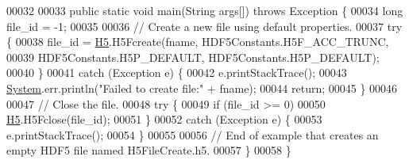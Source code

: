 \begin{DoxyCode}
00032 
00033     \textcolor{keyword}{public} \textcolor{keyword}{static} \textcolor{keywordtype}{void} main(String args[]) \textcolor{keywordflow}{throws} Exception \{
00034         \textcolor{keywordtype}{long} file\_id = -1;
00035 
00036         \textcolor{comment}{// Create a new file using default properties.}
00037         \textcolor{keywordflow}{try} \{
00038             file\_id = \hyperlink{namespace_h5}{H5}.H5Fcreate(fname, HDF5Constants.H5F\_ACC\_TRUNC,
00039                     HDF5Constants.H5P\_DEFAULT, HDF5Constants.H5P\_DEFAULT);
00040         \}
00041         \textcolor{keywordflow}{catch} (Exception e) \{
00042             e.printStackTrace();
00043             \hyperlink{namespace_system}{System}.err.println(\textcolor{stringliteral}{"Failed to create file:"} + fname);
00044             \textcolor{keywordflow}{return};
00045         \}
00046 
00047         \textcolor{comment}{// Close the file.}
00048         \textcolor{keywordflow}{try} \{
00049             \textcolor{keywordflow}{if} (file\_id >= 0)
00050                 \hyperlink{namespace_h5}{H5}.H5Fclose(file\_id);
00051         \}
00052         \textcolor{keywordflow}{catch} (Exception e) \{
00053             e.printStackTrace();
00054         \}
00055 
00056         \textcolor{comment}{// End of example that creates an empty HDF5 file named H5FileCreate.h5.}
00057     \}
00058 \}
\end{DoxyCode}
